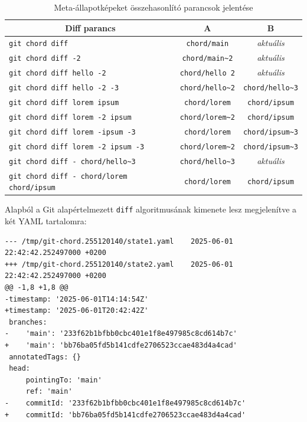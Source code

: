 \documentclass[
]{elteikthesis}[2025/03/25]
\begin{document}
\begin{table}[h]
\captionsetup{justification=justified, singlelinecheck=false}
\begin{center}
\begin{tabular}{|l|c|c|} 
 \hline
 \multicolumn{1}{|c}{\textbf{Diff parancs}} &
 \multicolumn{1}{|c}{\textbf{A}} &
 \multicolumn{1}{|c|}{\textbf{B}} \\
 \hline\hline
 
 \texttt{git chord diff} & \texttt{chord/main} & \textit{aktuális} \\
 \texttt{git chord diff -2} & \texttt{chord/main\~{}2} & \textit{aktuális} \\
 \texttt{git chord diff hello -2} & \texttt{chord/hello~{}2} & \textit{aktuális} \\
 \texttt{git chord diff hello -2 -3} & \texttt{chord/hello\~{}2} & \texttt{chord/hello\~{}3} \\
 \texttt{git chord diff lorem ipsum} & \texttt{chord/lorem} & \texttt{chord/ipsum} \\
 \texttt{git chord diff lorem -2 ipsum} & \texttt{chord/lorem\~{}2} & \texttt{chord/ipsum} \\
 \texttt{git chord diff lorem -ipsum -3} & \texttt{chord/lorem} & \texttt{chord/ipsum\~{}3} \\
 \texttt{git chord diff lorem -2 ipsum -3} & \texttt{chord/lorem\~{}2} & \texttt{chord/ipsum\~{}3} \\
 \texttt{git chord diff - chord/hello\~{}3} & \texttt{chord/hello\~{}3} & \textit{aktuális} \\
 \texttt{git chord diff - chord/lorem chord/ipsum} & \texttt{chord/lorem} & \texttt{chord/ipsum} \\
 
 \hline
 
\end{tabular}
\end{center}
\caption{Meta-állapotképeket összehasonlító parancsok jelentése}
\label{tab:diff-commands}
\end{table}

Alapból a Git alapértelmezett \verb|diff| algoritmusának kimenete lesz megjelenítve a két YAML tartalomra:

\begin{verbatim}
--- /tmp/git-chord.255120140/state1.yaml	2025-06-01 22:42:42.252497000 +0200
+++ /tmp/git-chord.255120140/state2.yaml	2025-06-01 22:42:42.252497000 +0200
@@ -1,8 +1,8 @@
-timestamp: '2025-06-01T14:14:54Z'
+timestamp: '2025-06-01T20:42:42Z'
 branches:
-    'main': '233f62b1bfbb0cbc401e1f8e497985c8cd614b7c'
+    'main': 'bb76ba05fd5b141cdfe2706523ccae483d4a4cad'
 annotatedTags: {}
 head:
     pointingTo: 'main'
     ref: 'main'
-    commitId: '233f62b1bfbb0cbc401e1f8e497985c8cd614b7c'
+    commitId: 'bb76ba05fd5b141cdfe2706523ccae483d4a4cad'
\end{verbatim}
\end{document}
